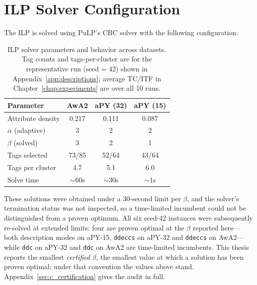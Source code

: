 \section{ILP Solver Configuration}
\label{sec:ilp_solver_config}

The ILP is solved using PuLP's CBC solver with the following configuration:

\begin{table}[H]
    \centering
    \caption{ILP solver parameters and behavior across datasets. Tag counts and tags-per-cluster are for the representative run (seed = 42) shown in Appendix~\ref{app:descriptions}; average TC/ITF in Chapter~\ref{chap:experiments} are over all 10 runs.}
    \label{tab:ilp_config}
    \begin{tabular}{lccc}
        \toprule
        \textbf{Parameter} & \textbf{AwA2} & \textbf{aPY (32)} & \textbf{aPY (15)} \\
        \midrule
        Attribute density & 0.217 & 0.111 & 0.087 \\
        $\alpha$ (adaptive) & 3 & 2 & 2 \\
        $\beta$ (solved) & 3 & 2 & 1 \\
        Tags selected & 73/85 & 52/64 & 43/64 \\
        Tags per cluster & 4.7 & 5.1 & 6.0 \\
        Solve time & $\sim$60s & $\sim$30s & $\sim$1s \\
        \bottomrule
    \end{tabular}
\end{table}

These solutions were obtained under a 30-second limit per $\beta$, and the solver's termination status was not inspected, so a time-limited incumbent could not be distinguished from a proven optimum. All six seed-42 instances were subsequently re-solved at extended limits: four are proven optimal at the $\beta$ reported here---both description modes on aPY-15, \texttt{ddeccs} on aPY-32 and \texttt{ddeccs} on AwA2---while \texttt{ddc} on aPY-32 and \texttt{ddc} on AwA2 are time-limited incumbents. This thesis reports the smallest \emph{certified} $\beta$, the smallest value at which a solution has been proven optimal; under that convention the values above stand. Appendix~\ref{sec:c_certification} gives the audit in full.
